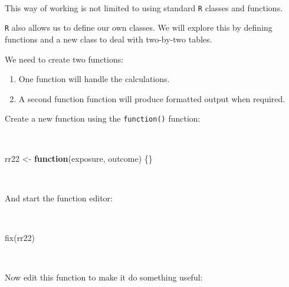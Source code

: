 \documentclass[
  12pt,
  a4paper]{book}
\newenvironment{Shaded}{\begin{snugshade}}{\end{snugshade}}
\newcommand{\ControlFlowTok}[1]{\textcolor[rgb]{0.13,0.29,0.53}{\textbf{#1}}}
\newcommand{\FunctionTok}[1]{\textcolor[rgb]{0.00,0.00,0.00}{#1}}
\newcommand{\NormalTok}[1]{#1}
\newcommand{\OtherTok}[1]{\textcolor[rgb]{0.56,0.35,0.01}{#1}}
\begin{document}
~

This way of working is not limited to using standard \texttt{R} classes and functions.

\texttt{R} also allows us to define our own classes. We will explore this by defining functions and a new class to deal
with two-by-two tables.

We need to create two functions:

\begin{enumerate}
\def\labelenumi{\arabic{enumi}.}
\item
  One function will handle the calculations.
\item
  A second function function will produce formatted output when required.
\end{enumerate}

Create a new function using the \texttt{function()} function:

~

\begin{Shaded}
\begin{Highlighting}[]
\NormalTok{rr22 }\OtherTok{\textless{}{-}} \ControlFlowTok{function}\NormalTok{(exposure, outcome) \{\}}
\end{Highlighting}
\end{Shaded}

~

And start the function editor:

~

\begin{Shaded}
\begin{Highlighting}[]
\FunctionTok{fix}\NormalTok{(rr22)}
\end{Highlighting}
\end{Shaded}

~

Now edit this function to make it do something useful:

~
\end{document}
